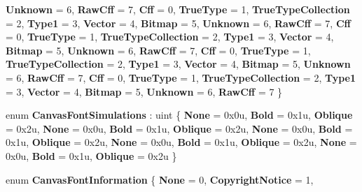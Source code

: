 \begin{DoxyCompactItemize}
{\bfseries Unknown} = 6, 
{\bfseries Raw\+Cff} = 7, 
\newline
{\bfseries Cff} = 0, 
{\bfseries True\+Type} = 1, 
{\bfseries True\+Type\+Collection} = 2, 
{\bfseries Type1} = 3, 
\newline
{\bfseries Vector} = 4, 
{\bfseries Bitmap} = 5, 
{\bfseries Unknown} = 6, 
{\bfseries Raw\+Cff} = 7, 
\newline
{\bfseries Cff} = 0, 
{\bfseries True\+Type} = 1, 
{\bfseries True\+Type\+Collection} = 2, 
{\bfseries Type1} = 3, 
\newline
{\bfseries Vector} = 4, 
{\bfseries Bitmap} = 5, 
{\bfseries Unknown} = 6, 
{\bfseries Raw\+Cff} = 7, 
\newline
{\bfseries Cff} = 0, 
{\bfseries True\+Type} = 1, 
{\bfseries True\+Type\+Collection} = 2, 
{\bfseries Type1} = 3, 
\newline
{\bfseries Vector} = 4, 
{\bfseries Bitmap} = 5, 
{\bfseries Unknown} = 6, 
{\bfseries Raw\+Cff} = 7, 
\newline
{\bfseries Cff} = 0, 
{\bfseries True\+Type} = 1, 
{\bfseries True\+Type\+Collection} = 2, 
{\bfseries Type1} = 3, 
\newline
{\bfseries Vector} = 4, 
{\bfseries Bitmap} = 5, 
{\bfseries Unknown} = 6, 
{\bfseries Raw\+Cff} = 7
 \}
\item 
\mbox{\label{namespace_microsoft_1_1_graphics_1_1_canvas_1_1_text_a2a86f72637a3f77480105b5a22f96b31}} 
enum {\bfseries Canvas\+Font\+Simulations} \+: uint \{ \newline
{\bfseries None} = 0x0u, 
{\bfseries Bold} = 0x1u, 
{\bfseries Oblique} = 0x2u, 
{\bfseries None} = 0x0u, 
\newline
{\bfseries Bold} = 0x1u, 
{\bfseries Oblique} = 0x2u, 
{\bfseries None} = 0x0u, 
{\bfseries Bold} = 0x1u, 
\newline
{\bfseries Oblique} = 0x2u, 
{\bfseries None} = 0x0u, 
{\bfseries Bold} = 0x1u, 
{\bfseries Oblique} = 0x2u, 
\newline
{\bfseries None} = 0x0u, 
{\bfseries Bold} = 0x1u, 
{\bfseries Oblique} = 0x2u
 \}
\item 
\mbox{\label{namespace_microsoft_1_1_graphics_1_1_canvas_1_1_text_a73fd564ee5399477f9a464ec4ba43d40}} 
enum {\bfseries Canvas\+Font\+Information} \{ \newline
{\bfseries None} = 0, 
{\bfseries Copyright\+Notice} = 1, 

\end{DoxyCompactItemize}
